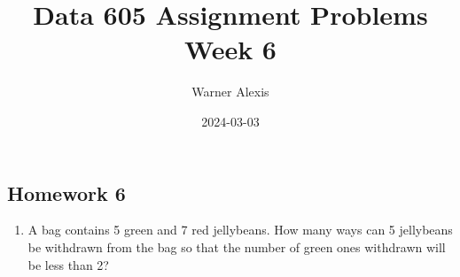 \documentclass[
]{article}
\title{Data 605 Assignment Problems Week 6}
\author{Warner Alexis}
\date{2024-03-03}
\providecommand{\tightlist}{%
  \setlength{\itemsep}{0pt}\setlength{\parskip}{0pt}}
\begin{document}
\maketitle

\hypertarget{homework-6}{%
\subsection{Homework 6}\label{homework-6}}

\begin{enumerate}
\def\labelenumi{\arabic{enumi}.}
\tightlist
\item
  A bag contains 5 green and 7 red jellybeans. How many ways can 5
  jellybeans be withdrawn from the bag so that the number of green ones
  withdrawn will be less than 2?
\end{enumerate}
\end{document}
